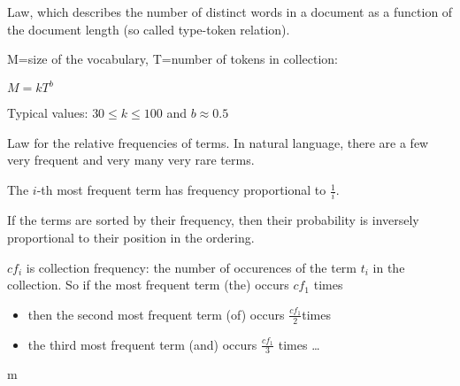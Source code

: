 \begin{breakbox}

Law, which describes the number of distinct words in a document as a function of the document length (so called type-token relation).

M=size of the vocabulary, T=number of tokens in collection:
\begin{center}
	$M=kT^b$
\end{center}

Typical values: $30 \leq k \leq 100$ and $b \approx 0.5$
\end{breakbox}

\begin{breakbox}

Law for the relative frequencies of terms. In natural language, there are a few very frequent and very many very rare terms.

\begin{center}
	The $i$-th most frequent term has frequency proportional to $\frac{1}{i}$.
\end{center}

If the terms are sorted by their frequency, then their probability is inversely proportional to their position in the ordering.

$cf_i$ is collection frequency: the number of occurences of the term $t_i$ in the collection. So if the most frequent term (the) occurs $cf_1$ times
\begin{itemize}
	\item then the second most frequent term (of) occurs
$\frac{cf_1}{2}$times
	\item the third most frequent term (and) occurs $\frac{cf_1}{3}$ times \ldots
\end{itemize}m
\end{breakbox}

